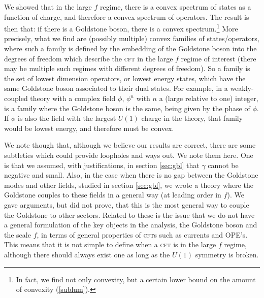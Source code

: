 \documentclass[11pt]{article}
\numberwithin{equation}{section}
\begin{document}
We showed that in the large $f$ regime, there is a convex spectrum of states as a function of charge, and therefore a convex spectrum of operators. The  result is then that: if there is a Goldstone boson, there is a convex spectrum.\footnote{In fact, we find not only convexity, but a certain lower bound on the amount of convexity (\ref{sublum}).} More precisely, what we find are (possibly multiple) convex families of states/operators, where such a family is defined by the embedding of the Goldstone boson into the degrees of freedom which describe the \textsc{cft} in the large $f$ regime of interest (there may be multiple such regimes with different degrees of freedom). So a family is the set of lowest dimension operators, or lowest energy states, which have the same Goldstone boson associated to their dual states. For example, in a weakly-coupled theory with a complex field $\phi$, $\phi^n$ with $n$ a (large relative to one) integer, is a family where the Goldstone boson is the same, being given by the phase of $\phi$. If $\phi$ is also the field with the largest $U(1)$ charge in the theory, that family would be lowest energy, and therefore must be convex.

We note though that, although we believe our results are correct, there are some subtleties which could provide loopholes and ways out. We note them here. One is that we assumed, with justifications, in section \ref{sec:gbl} that $\gamma$ cannot be negative and small. Also, in the case when there is no gap between the Goldstone modes and other fields, studied in section \ref{sec:gbl}, we wrote a theory where the Goldstone couples to these fields in a general way (at leading order in $f$). We gave arguments, but did not prove, that this is the most general way to couple the Goldstone to other sectors. Related to these is the issue that we do not have a general formulation of the key objects in the analysis, the Goldstone boson and the scale $f$, in terms of general properties of \textsc{cft}s such as currents and OPE's. This means that it is not simple to define when a \textsc{cft} is in the large $f$ regime, although there should always exist one as long as the $U(1)$ symmetry is broken. 
\end{document}
